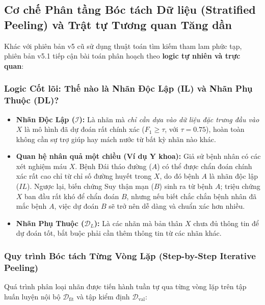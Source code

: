 \documentclass[11pt,a4paper]{article}
\begin{document}
\subsection{Cơ chế Phân tầng Bóc tách Dữ liệu (Stratified Peeling) và Trật tự Tương quan Tăng dần}
\label{subsec:stratified_peeling}

Khác với phiên bản v5 cũ sử dụng thuật toán tìm kiếm tham lam phức tạp, phiên bản v5.1 tiếp cận bài toán phân hoạch theo \textbf{logic tự nhiên và trực quan}:

\subsubsection{Logic Cốt lõi: Thế nào là Nhãn Độc Lập (IL) và Nhãn Phụ Thuộc (DL)?}
\begin{itemize}
    \item \textbf{Nhãn Độc Lập ($\mathcal{I}$):} Là nhãn mà \textit{chỉ cần dựa vào dữ liệu đặc trưng đầu vào $X$} là mô hình đã dự đoán rất chính xác ($F_1 \ge \tau$, với $\tau = 0.75$), hoàn toàn không cần sự trợ giúp hay mách nước từ bất kỳ nhãn nào khác.
    \item \textbf{Quan hệ nhân quả một chiều (Ví dụ Y khoa):} Giả sử bệnh nhân có các xét nghiệm máu $X$. Bệnh Đái tháo đường ($A$) có thể được chẩn đoán chính xác rất cao chỉ từ chỉ số đường huyết trong $X$, do đó bệnh $A$ là nhãn độc lập ($IL$). Ngược lại, biến chứng Suy thận mạn ($B$) sinh ra từ bệnh $A$; triệu chứng $X$ ban đầu rất khó để chẩn đoán $B$, nhưng nếu biết chắc chắn bệnh nhân đã mắc bệnh $A$, việc dự đoán $B$ sẽ trở nên dễ dàng và chuẩn xác hơn nhiều.
    \item \textbf{Nhãn Phụ Thuộc ($\mathcal{D}_L$):} Là các nhãn mà bản thân $X$ chưa đủ thông tin để dự đoán tốt, bắt buộc phải cần thêm thông tin từ các nhãn khác.
\end{itemize}

\subsubsection{Quy trình Bóc tách Từng Vòng Lặp (Step-by-Step Iterative Peeling)}
Quá trình phân loại nhãn được tiến hành tuần tự qua từng vòng lặp trên tập huấn luyện nội bộ $\mathcal{D}_{\text{fit}}$ và tập kiểm định $\mathcal{D}_{\text{val}}$:
\end{document}
